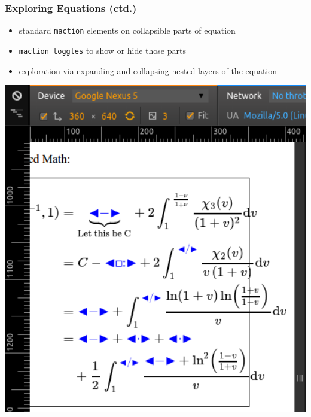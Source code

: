 \documentclass{beamer}
\begin{document}
\begin{frame}
  \frametitle{Exploring Equations (ctd.)}
  \begin{minipage}{.49\linewidth}
    \begin{itemize}
    \item standard \texttt{maction} elements on collapsible parts of equation
    \item \texttt{maction toggles} to show or hide those parts
    \item exploration via expanding and collapsing nested layers of the equation
    \end{itemize}
  \end{minipage}
  \begin{minipage}{.49\linewidth}
    \includegraphics[width=1\textwidth]{./ex_long_collapse2.png}
  \end{minipage}
\end{frame}
\end{document}
